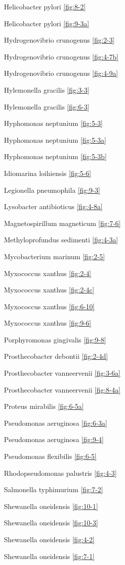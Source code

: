 \documentclass[]{tufte-book}
\begin{document}
Helicobacter pylori \ref{fig:8-2}

Helicobacter pylori \ref{fig:9-3a}

Hydrogenovibrio crunogenus \ref{fig:2-3}

Hydrogenovibrio crunogenus \ref{fig:4-7b}

Hydrogenovibrio crunogenus \ref{fig:4-9a}

Hylemonella gracilis \ref{fig:3-3}

Hylemonella gracilis \ref{fig:6-3}

Hyphomonas neptunium \ref{fig:5-3}

Hyphomonas neptunium \ref{fig:5-3a}

Hyphomonas neptunium \ref{fig:5-3b}

Idiomarina loihiensis \ref{fig:5-6}

Legionella pneumophila \ref{fig:9-3}

Lysobacter antibioticus \ref{fig:4-8a}

Magnetospirillum magneticum \ref{fig:7-6}

Methyloprofundus sedimenti \ref{fig:4-3a}

Mycobacterium marinum \ref{fig:2-5}

Myxococcus xanthus \ref{fig:2-4}

Myxococcus xanthus \ref{fig:2-4c}

Myxococcus xanthus \ref{fig:6-10}

Myxococcus xanthus \ref{fig:9-6}

Porphyromonas gingivalis \ref{fig:9-8}

Prosthecobacter debontii \ref{fig:2-4d}

Prosthecobacter vanneervenii \ref{fig:3-6a}

Prosthecobacter vanneervenii \ref{fig:8-4a}

Proteus mirabilis \ref{fig:6-5a}

Pseudomonas aeruginosa \ref{fig:6-3a}

Pseudomonas aeruginosa \ref{fig:9-4}

Pseudomonas flexibilis \ref{fig:6-5}

Rhodopseudomonas palustris \ref{fig:4-3}

Salmonella typhimurium \ref{fig:7-2}

Shewanella oneidensis \ref{fig:10-1}

Shewanella oneidensis \ref{fig:10-3}

Shewanella oneidensis \ref{fig:4-2}

Shewanella oneidensis \ref{fig:7-1}
\end{document}
